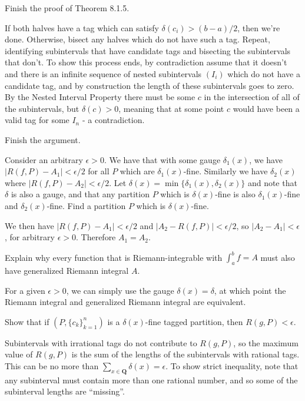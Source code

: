 \begin{exercise}
Finish the proof of Theorem 8.1.5.
\end{exercise}
\begin{solution}
If both halves have a tag which can satisfy \(\delta(c_i) > (b-a)/2\), then we're done. Otherwise, bisect any halves which do not have such a tag. Repeat, identifying subintervals that have candidate tags and bisecting the subintervals that don't. To show this process ends, by contradiction assume that it doesn't and there is an infinite sequence of nested subintervals \((I_i)\) which do not have a candidate tag, and by construction the length of these subintervals goes to zero. By the Nested Interval Property there must be some \(c\) in the intersection of all of the subintervals, but \(\delta(c) > 0\), meaning that at some point \(c\) would have been a valid tag for some \(I_n\) - a contradiction.
\end{solution}

\begin{exercise}
Finish the argument.
\end{exercise}
\begin{solution}
Consider an arbitrary \(\epsilon > 0\). We have that with some gauge \(\delta_1(x)\), we have \(|R(f,P) - A_1| < \epsilon / 2\) for all \(P\) which are \(\delta_1(x)\)-fine. Similarly we have \(\delta_2(x)\) where \(|R(f,P) - A_2| < \epsilon / 2\). Let \(\delta(x) = \min\{\delta_1(x), \delta_2(x)\}\) and note that \(\delta\) is also a gauge, and that any partition \(P\) which is \(\delta(x)\)-fine is also \(\delta_1(x)\)-fine and \(\delta_2(x)\)-fine. Find a partition \(P\) which is \(\delta(x)\)-fine.

We then have \(|R(f,P) - A_1| < \epsilon/2\) and \(|A_2 - R(f,P)| < \epsilon/2\), so \(|A_2 - A_1| < \epsilon\), for arbitrary \(\epsilon > 0\). Therefore \(A_1 = A_2\).
\end{solution}

\begin{exercise}
Explain why every function that is Riemann-integrable with \(\int^b_a f = A\) must also have generalized Riemann integral \(A\).
\end{exercise}
\begin{solution}
For a given \(\epsilon > 0\), we can simply use the gauge \(\delta(x) = \delta\), at which point the Riemann integral and generalized Riemann integral are equivalent.
\end{solution}

\begin{exercise}
Show that if \((P, \{c_k\}^n_{k=1})\) is a \(\delta(x)\)-fine tagged partition, then \(R(g,P) < \epsilon\).
\end{exercise}
\begin{solution}
Subintervals with irrational tags do not contribute to \(R(g,P)\), so the maximum value of \(R(g,P)\) is the sum of the lengths of the subintervals with rational tags. This can be no more than \(\sum_{x \in \mathbf{Q}} \delta(x) = \epsilon\). To show strict inequality, note that any subinterval must contain more than one rational number, and so some of the subinterval lengths are ``missing''.
\end{solution}


